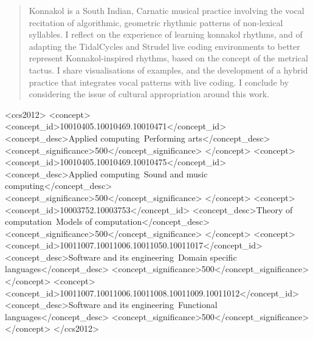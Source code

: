 \documentclass[sigplan,screen]{acmart}
\begin{document}
\author{Alex McLean}

\begin{abstract}
Konnakol is a South Indian, Carnatic musical practice involving the
vocal recitation of algorithmic, geometric rhythmic patterns of
non-lexical syllables. I reflect on the experience of learning
konnakol rhythms, and of adapting the TidalCycles and Strudel live
coding environments to better represent Konnakol-inspired rhythms,
based on the concept of the metrical tactus. I share visualisations of
examples, and the development of a hybrid practice that integrates
vocal patterns with live coding. I conclude by considering the issue
of cultural appropriation around this work.
\end{abstract}


\begin{CCSXML}
<ccs2012>
   <concept>
       <concept_id>10010405.10010469.10010471</concept_id>
       <concept_desc>Applied computing~Performing arts</concept_desc>
       <concept_significance>500</concept_significance>
       </concept>
   <concept>
       <concept_id>10010405.10010469.10010475</concept_id>
       <concept_desc>Applied computing~Sound and music computing</concept_desc>
       <concept_significance>500</concept_significance>
       </concept>
   <concept>
       <concept_id>10003752.10003753</concept_id>
       <concept_desc>Theory of computation~Models of computation</concept_desc>
       <concept_significance>500</concept_significance>
       </concept>
   <concept>
       <concept_id>10011007.10011006.10011050.10011017</concept_id>
       <concept_desc>Software and its engineering~Domain specific languages</concept_desc>
       <concept_significance>500</concept_significance>
       </concept>
   <concept>
       <concept_id>10011007.10011006.10011008.10011009.10011012</concept_id>
       <concept_desc>Software and its engineering~Functional languages</concept_desc>
       <concept_significance>500</concept_significance>
       </concept>
 </ccs2012>
\end{CCSXML}



\maketitle


\end{document}
